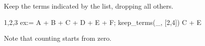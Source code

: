 
Keep the terms indicated by the list, dropping all others.
\begin{screen}{1,2,3}
ex:= A + B + C + D + E + F;
keep_terms(_, [2,4])
C + E
\end{screen}
Note that counting starts from zero.

